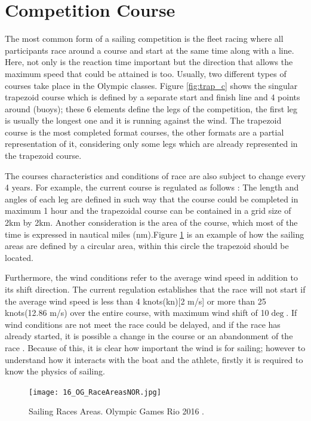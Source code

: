 \section{Competition Course}\label{tracks}
The most common form of a sailing competition is the fleet racing where all participants race around a course and start at the same time along with a line. Here, not only is the reaction time important but the direction that allows the maximum speed that could be attained is too. Usually, two different types of courses take place in the Olympic classes. Figure \ref{fig:trap_c} shows the singular trapezoid course which is defined by a separate start and finish line and 4 points around (buoys); these 6 elements define the legs of the competition, the first leg is usually the longest one and it is running against the wind.
The trapezoid course is the most completed format courses, the other formats are a partial representation of it, considering only some legs which are already represented in the trapezoid course.\par 

The courses characteristics and conditions of race are also subject to change every 4 years. For example, the current course is regulated as follows \cite{race_pol}: The length and angles of each leg are defined in such way that the course could be completed in maximum 1 hour and the trapezoidal course can be contained in a grid size of 2km by 2km.  Another consideration is the area of the course,  which most of the time is expressed in nautical miles (nm).Figure \ref{fig:olymp_areas_rio} is an example of how the sailing areas are defined by a circular area, within this circle the trapezoid should be located. \par 
Furthermore, the wind conditions refer to the average wind speed in addition to its shift direction. The current regulation establishes that the race will not start if the average wind speed is less than 4 knots(kn)[2 m/s] or more than 25 knots(12.86 m/s) over the entire course, with maximum wind shift of 10$\deg$. 
If wind conditions are not meet the race could be delayed, and if the race has already started, it is possible a change in the course or an abandonment of the race \cite{race_pol}. Because of this, it is clear how important the wind is for sailing; however to understand how it interacts with the boat and the athlete, firstly it is required to know the physics of sailing. \par 
\begin{figure}[ht]
\centering
 \texttt{[image: 16\_OG\_RaceAreasNOR.jpg]}
  \caption{Sailing Races Areas. Olympic Games Rio 2016 \cite{instr_rio}.}
\label{fig:olymp_areas_rio} 
\end{figure}

